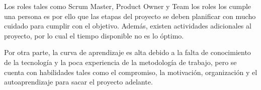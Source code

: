 Los roles tales como Scrum Master, Product Owner y Team los roles los cumple una persona es por ello que las etapas del proyecto se deben planificar con mucho cuidado para cumplir con el objetivo. Además, existen actividades adicionales al proyecto, por lo cual el tiempo disponible no es lo óptimo.

Por otra parte, la curva de aprendizaje es alta debido a la falta de conocimiento de la tecnología y la poca experiencia de la metodología de trabajo, pero se cuenta con habilidades tales como el compromiso, la motivación, organización y el autoaprendizaje para sacar el proyecto adelante.
